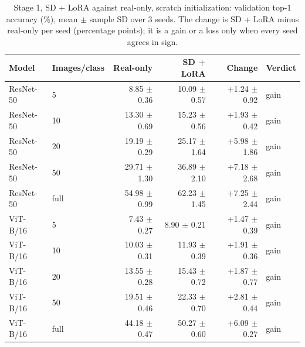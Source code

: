 \begin{table}[H]
\centering
\caption{Stage 1, SD + LoRA against real-only, scratch initialization: validation top-1 accuracy (\%), mean $\pm$ sample SD over 3 seeds. The change is SD + LoRA minus real-only per seed (percentage points); it is a gain or a loss only when every seed agrees in sign.}
\label{tab:stage1-scratch-accuracy-sd_lora}
\begin{tabular}{llrrrl}
\toprule
Model & Images/class & Real-only & SD + LoRA & Change & Verdict \\
\midrule
ResNet-50 & 5 & 8.85 $\pm$ 0.36 & 10.09 $\pm$ 0.57 & +1.24 $\pm$ 0.92 & gain \\
ResNet-50 & 10 & 13.30 $\pm$ 0.69 & 15.23 $\pm$ 0.56 & +1.93 $\pm$ 0.42 & gain \\
ResNet-50 & 20 & 19.19 $\pm$ 0.29 & 25.17 $\pm$ 1.64 & +5.98 $\pm$ 1.86 & gain \\
ResNet-50 & 50 & 29.71 $\pm$ 1.30 & 36.89 $\pm$ 2.10 & +7.18 $\pm$ 2.68 & gain \\
ResNet-50 & full & 54.98 $\pm$ 0.99 & 62.23 $\pm$ 1.45 & +7.25 $\pm$ 2.44 & gain \\
\midrule
ViT-B/16 & 5 & 7.43 $\pm$ 0.27 & 8.90 $\pm$ 0.21 & +1.47 $\pm$ 0.39 & gain \\
ViT-B/16 & 10 & 10.03 $\pm$ 0.31 & 11.93 $\pm$ 0.39 & +1.91 $\pm$ 0.36 & gain \\
ViT-B/16 & 20 & 13.55 $\pm$ 0.28 & 15.43 $\pm$ 0.72 & +1.87 $\pm$ 0.77 & gain \\
ViT-B/16 & 50 & 19.51 $\pm$ 0.46 & 22.33 $\pm$ 0.70 & +2.81 $\pm$ 0.44 & gain \\
ViT-B/16 & full & 44.18 $\pm$ 0.47 & 50.27 $\pm$ 0.60 & +6.09 $\pm$ 0.27 & gain \\
\bottomrule
\end{tabular}
\end{table}
